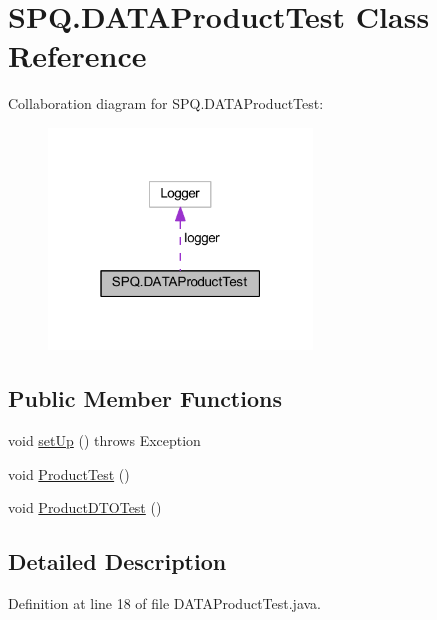\hypertarget{class_s_p_q_1_1_d_a_t_a_product_test}{}\section{S\+P\+Q.\+D\+A\+T\+A\+Product\+Test Class Reference}
\label{class_s_p_q_1_1_d_a_t_a_product_test}


Collaboration diagram for S\+P\+Q.\+D\+A\+T\+A\+Product\+Test\+:\nopagebreak
\begin{figure}[H]
\begin{center}
\leavevmode
\includegraphics[width=199pt]{class_s_p_q_1_1_d_a_t_a_product_test__coll__graph}
\end{center}
\end{figure}
\subsection*{Public Member Functions}
\begin{DoxyCompactItemize}
\item 
void \mbox{\hyperlink{class_s_p_q_1_1_d_a_t_a_product_test_a64e9238fb4b99af0cdf55768230b4c89}{set\+Up}} ()  throws Exception 
\item 
void \mbox{\hyperlink{class_s_p_q_1_1_d_a_t_a_product_test_afb49da7389a7f4f42159adf87b4a11be}{Product\+Test}} ()
\item 
void \mbox{\hyperlink{class_s_p_q_1_1_d_a_t_a_product_test_a572f5f092c734feea3c7d8767b4a86c5}{Product\+D\+T\+O\+Test}} ()
\end{DoxyCompactItemize}


\subsection{Detailed Description}


Definition at line 18 of file D\+A\+T\+A\+Product\+Test.\+java.



